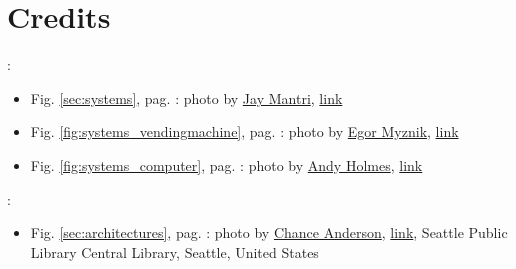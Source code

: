 \section[Credits]{Credits}
% 

\newcommand{\photoref}[4]{Fig. \ref{#1}, pag. \pageref{#1}: photo by \href{#3}{#2}, \href{#4}{link}}

\begin{frame}

	\textbf{}:
	\begin{itemize}
		\item \photoref{sec:systems}{Jay Mantri}{https://jaymantri.com/}{https://jaymantri.com/post/104375101928/download}
		\item \photoref{fig:systems_vendingmachine}{Egor Myznik}{https://unsplash.com/it/@vonshnauzer}{https://unsplash.com/it/foto/DRs9XsNlAZw}
		\item \photoref{fig:systems_computer}{Andy Holmes}{https://unsplash.com/it/@andyjh07}{https://unsplash.com/it/foto/EOAKUQcsFIU}
	\end{itemize}
	
	
	\textbf{}:
	\begin{itemize}
		\item \photoref{sec:architectures}{Chance Anderson}{https://unsplash.com/it/@chanceanderson}{https://unsplash.com/it/foto/if2coegqwZU}, Seattle Public Library Central Library, Seattle, United States
	\end{itemize}
	
\end{frame}


 